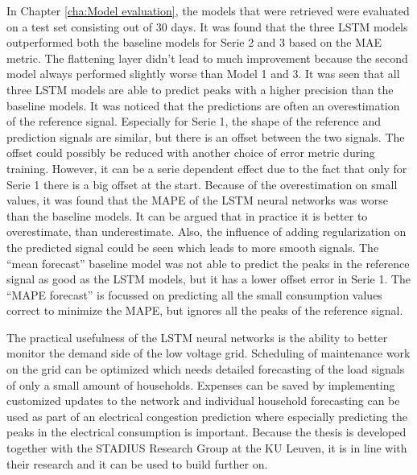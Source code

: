 In Chapter \ref{cha:Model evaluation}, the models that were retrieved were evaluated on a test set consisting out of 30 days. It was found that the three LSTM models outperformed both the baseline models for Serie 2 and 3 based on the MAE metric. The flattening layer didn't lead to much improvement because the second model always performed slightly worse than Model 1 and 3. It was seen that all three LSTM models are able to predict peaks with a higher precision than the baseline models. It was noticed that the predictions are often an overestimation of the reference signal. Especially for Serie 1, the shape of the reference and prediction signals are similar, but there is an offset between the two signals. The offset could possibly be reduced with another choice of error metric during training. However, it can be a serie dependent effect due to the fact that only for Serie 1 there is a big offset at the start. Because of the overestimation on small values, it was found that the MAPE of the LSTM neural networks was worse than the baseline models. It can be argued that in practice it is better to overestimate, than underestimate. Also, the influence of adding regularization on the predicted signal could be seen which leads to more smooth signals. The ``mean forecast'' baseline model was not able to predict the peaks in the reference signal as good as the LSTM models, but it has a lower offset error in Serie 1. The ``MAPE forecast'' is focussed on predicting all the small consumption values correct to minimize the MAPE, but ignores all the peaks of the reference signal.

The practical usefulness of the LSTM neural networks is the ability to better monitor the demand side of the low voltage grid. Scheduling of maintenance work on the grid can be optimized which needs detailed forecasting of the load signals of only a small amount of households. Expenses can be saved by implementing customized updates to the network and individual household forecasting can be used as part of an electrical congestion prediction where especially predicting the peaks in the electrical consumption is important. Because the thesis is developed together with the STADIUS Research Group at the KU Leuven, it is in line with their research and it can be used to build further on.\\


